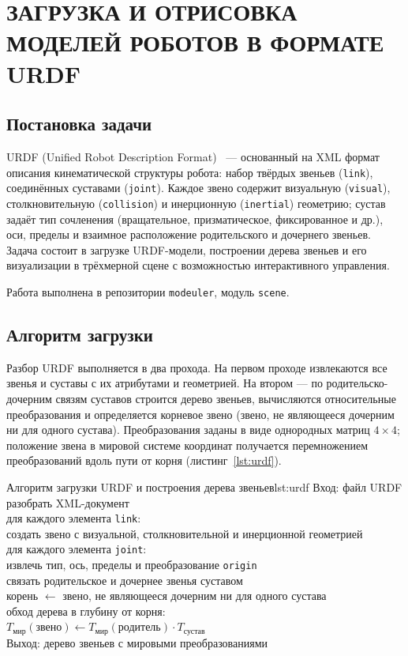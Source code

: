 \chapter{ЗАГРУЗКА И ОТРИСОВКА МОДЕЛЕЙ РОБОТОВ В ФОРМАТЕ URDF}
\label{cha:urdf}

\section{Постановка задачи}

URDF (Unified Robot Description Format)~\cite{urdf} --- основанный на XML формат
описания кинематической структуры робота: набор твёрдых звеньев (\texttt{link}),
соединённых суставами (\texttt{joint}). Каждое звено содержит визуальную
(\texttt{visual}), столкновительную (\texttt{collision}) и инерционную
(\texttt{inertial}) геометрию; сустав задаёт тип сочленения (вращательное,
призматическое, фиксированное и др.), оси, пределы и взаимное расположение
родительского и дочернего звеньев. Задача состоит в загрузке URDF-модели,
построении дерева звеньев и его визуализации в трёхмерной сцене с возможностью
интерактивного управления.

Работа выполнена в репозитории \texttt{modeuler}, модуль \texttt{scene}.

\section{Алгоритм загрузки}

Разбор URDF выполняется в два прохода. На первом проходе извлекаются все звенья и
суставы с их атрибутами и геометрией. На втором --- по родительско-дочерним
связям суставов строится дерево звеньев, вычисляются относительные
преобразования и определяется корневое звено (звено, не являющееся дочерним ни
для одного сустава). Преобразования заданы в виде однородных матриц $4\times4$;
положение звена в мировой системе координат получается перемножением
преобразований вдоль пути от корня (листинг~\ref{lst:urdf}).

\begin{pseudocode}{Алгоритм загрузки URDF и построения дерева звеньев}{lst:urdf}
 Вход: файл URDF\\
 разобрать XML-документ\\
 для каждого элемента \texttt{link}:\\
 создать звено с визуальной, столкновительной и инерционной геометрией\\
 для каждого элемента \texttt{joint}:\\
 извлечь тип, ось, пределы и преобразование \texttt{origin}\\
 связать родительское и дочернее звенья суставом\\
 корень $\leftarrow$ звено, не являющееся дочерним ни для одного сустава\\
 обход дерева в глубину от корня:\\
 $T_{\text{мир}}(\text{звено}) \leftarrow
       T_{\text{мир}}(\text{родитель}) \cdot T_{\text{сустав}}$\\
 Выход: дерево звеньев с мировыми преобразованиями
\end{pseudocode}

